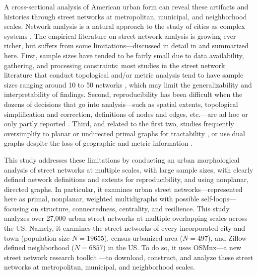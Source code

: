 \documentclass{article}
\begin{document}
A cross-sectional analysis of American urban form can reveal these artifacts and histories through street networks at metropolitan, municipal, and neighborhood scales. Network analysis is a natural approach to the study of cities as complex systems \cite{masucci_random_2009}. The empirical literature on street network analysis is growing ever richer, but suffers from some limitations---discussed in detail in \cite{boeing_osmnx:_2017} and summarized here. First, sample sizes have tended to be fairly small due to data availability, gathering, and processing constraints: most studies in the street network literature that conduct topological and/or metric analysis tend to have sample sizes ranging around 10 to 50 networks \cite{buhl_topological_2006, cardillo_structural_2006, barthelemy_modeling_2008, strano_urban_2013}, which may limit the generalizability and interpretability of findings. Second, reproducibility has been difficult when the dozens of decisions that go into analysis---such as spatial extents, topological simplification and correction, definitions of nodes and edges, etc.---are ad hoc or only partly reported \citep[e.g.,][]{porta_network_2006, strano_urban_2013}. Third, and related to the first two, studies frequently oversimplify to planar or undirected primal graphs for tractability \cite[e.g.,][]{buhl_topological_2006, cardillo_structural_2006, barthelemy_modeling_2008, masucci_random_2009}, or use dual graphs despite the loss of geographic and metric information \cite{batty_network_2005, jiang_integration_2002, ratti_space_2004, crucitti_centrality_2006, crucitti_centrality_2006-1}. 

This study addresses these limitations by conducting an urban morphological analysis of street networks at multiple scales, with large sample sizes, with clearly defined network definitions and extents for reproducibility, and using nonplanar, directed graphs. In particular, it examines urban street networks---represented here as primal, nonplanar, weighted multidigraphs with possible self-loops---focusing on structure, connectedness, centrality, and resilience. This study analyzes over 27,000 urban street networks at multiple overlapping scales across the US. Namely, it examines the street networks of every incorporated city and town (population size $N=19655$), census urbanized area ($N=497$), and Zillow-defined neighborhood ($N=6857$) in the US. To do so, it uses OSMnx---a new street network research toolkit \cite{boeing_osmnx:_2017}---to download, construct, and analyze these street networks at metropolitan, municipal, and neighborhood scales.
\end{document}
